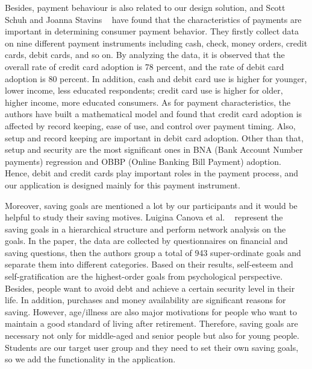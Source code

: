 \documentclass{sigchi}
\begin{document}
Besides, payment behaviour is also related to our design solution, and Scott Schuh and Joanna Stavins ~\cite{Pay} have found that the characteristics of payments are important in determining consumer payment behavior. They firstly collect data on nine different payment instruments including cash, check, money orders, credit cards, debit cards, and so on. By analyzing the data, it is observed that the overall rate of credit card adoption is 78 percent, and the rate of debit card adoption is 80 percent. In addition, cash and debit card use is higher for younger, lower income, less educated respondents; credit card use is higher for older, higher income, more educated consumers. As for payment characteristics, the authors have built a mathematical model and found that credit card adoption is affected by record keeping, ease of use, and control over payment timing. Also, setup and record keeping are important in debit card adoption. Other than that, setup and security are the most significant ones in BNA (Bank Account Number payments) regression and OBBP (Online Banking Bill Payment) adoption. Hence, debit and credit cards play important roles in the payment process, and our application is designed mainly for this payment instrument.
 
Moreover, saving goals are mentioned a lot by our participants and it would be helpful to study their saving motives. Luigina Canova et al. ~\cite{Saving} represent the saving goals in a hierarchical structure and perform network analysis on the goals. In the paper, the data are collected by questionnaires on financial and saving questions, then the authors group a total of 943 super-ordinate goals and separate them into different categories. Based on their results, self-esteem and self-gratification are the highest-order goals from psychological perspective. Besides, people want to avoid debt and achieve a certain security level in their life. In addition, purchases and money availability are significant reasons for saving. However, age/illness are also major motivations for people who want to maintain a good standard of living after retirement. Therefore, saving goals are necessary not only for middle-aged and senior people but also for young people. Students are our target user group and they need to set their own saving goals, so we add the functionality in the application.
\end{document}
